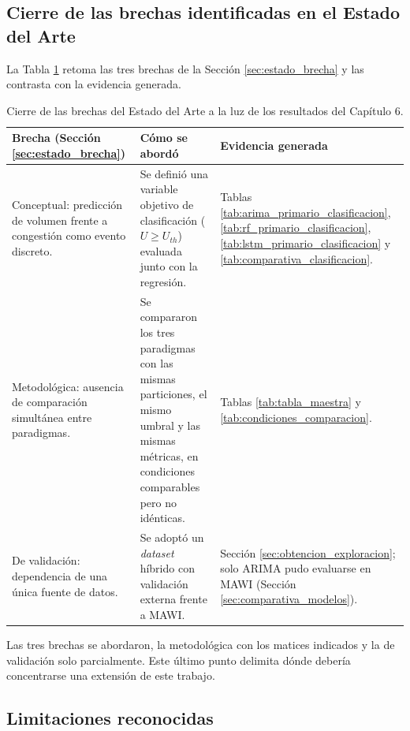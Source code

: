\documentclass[12pt]{report}
\begin{document}
\subsection*{Cierre de las brechas identificadas en el Estado del Arte}

La Tabla \ref{tab:cierre_brechas} retoma las tres brechas de la Sección \ref{sec:estado_brecha} y las contrasta con la evidencia generada.

\begin{table}[H]
    \centering
    \small
    \begin{tabular}{|p{3cm}|p{5.5cm}|p{5.2cm}|}
        \hline
        \textbf{Brecha (Sección \ref{sec:estado_brecha})} & \textbf{Cómo se abordó} & \textbf{Evidencia generada} \\
        \hline
        Conceptual: predicción de volumen frente a congestión como evento discreto. & Se definió una variable objetivo de clasificación ($U \geq U_{th}$) evaluada junto con la regresión. & Tablas \ref{tab:arima_primario_clasificacion}, \ref{tab:rf_primario_clasificacion}, \ref{tab:lstm_primario_clasificacion} y \ref{tab:comparativa_clasificacion}. \\
        \hline
        Metodológica: ausencia de comparación simultánea entre paradigmas. & Se compararon los tres paradigmas con las mismas particiones, el mismo umbral y las mismas métricas, en condiciones comparables pero no idénticas. & Tablas \ref{tab:tabla_maestra} y \ref{tab:condiciones_comparacion}. \\
        \hline
        De validación: dependencia de una única fuente de datos. & Se adoptó un \textit{dataset} híbrido con validación externa frente a MAWI. & Sección \ref{sec:obtencion_exploracion}; solo ARIMA pudo evaluarse en MAWI (Sección \ref{sec:comparativa_modelos}). \\
        \hline
    \end{tabular}
    \caption{Cierre de las brechas del Estado del Arte a la luz de los resultados del Capítulo 6.}
    \label{tab:cierre_brechas}
\end{table}

Las tres brechas se abordaron, la metodológica con los matices indicados y la de validación solo parcialmente. Este último punto delimita dónde debería concentrarse una extensión de este trabajo.

\subsection*{Limitaciones reconocidas}
\end{document}
